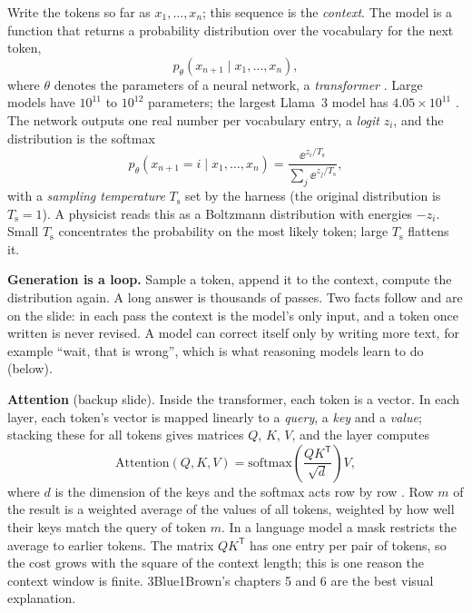 Write the tokens so far as $x_1, \ldots, x_n$; this sequence is the \emph{context}. The
model is a function that returns a probability distribution over the vocabulary for the
next token,
\begin{equation}
  p_\theta(x_{n+1} \mid x_1, \ldots, x_n),
\end{equation}
where $\theta$ denotes the parameters of a neural network, a \emph{transformer}
. Large models have $10^{11}$ to $10^{12}$ parameters; the largest Llama~3
model has $4.05 \times 10^{11}$ . The network outputs one real number per
vocabulary entry, a \emph{logit} $z_i$, and the distribution is the softmax
\begin{equation}
  p_\theta(x_{n+1} = i \mid x_1, \ldots, x_n)
    = \frac{\ee^{z_i/T_{\mathrm{s}}}}{\sum_j \ee^{z_j/T_{\mathrm{s}}}},
\end{equation}
with a \emph{sampling temperature} $T_{\mathrm{s}}$ set by the harness (the original
distribution is $T_{\mathrm{s}} = 1$). A physicist reads this as a Boltzmann
distribution with energies $-z_i$. Small $T_{\mathrm{s}}$ concentrates the probability
on the most likely token; large $T_{\mathrm{s}}$ flattens it.

\textbf{Generation is a loop.} Sample a token, append it to the context, compute the
distribution again. A long answer is thousands of passes. Two facts follow and are on the
slide: in each pass the context is the model's only input, and a token once written is
never revised. A model can correct itself only by writing more text, for example
``wait, that is wrong'', which is what reasoning models learn to do (below).

\textbf{Attention} (backup slide). Inside the transformer, each token is a vector. In
each layer, each token's vector is mapped linearly to a \emph{query}, a \emph{key} and a
\emph{value}; stacking these for all tokens gives matrices $Q$, $K$, $V$, and the layer
computes
\begin{equation}
  \mathrm{Attention}(Q, K, V) = \mathrm{softmax}\!\left(\frac{Q K^{\mathsf{T}}}{\sqrt{d}}\right) V,
\end{equation}
where $d$ is the dimension of the keys and the softmax acts row by row . Row
$m$ of the result is a weighted average of the values of all tokens, weighted by how well
their keys match the query of token $m$. In a language model a mask restricts the
average to earlier tokens. The matrix $Q K^{\mathsf{T}}$ has one entry per pair of
tokens, so the cost grows with the square of the context length; this is one reason the
context window is finite. 3Blue1Brown's chapters 5 and 6  are the best visual
explanation.


